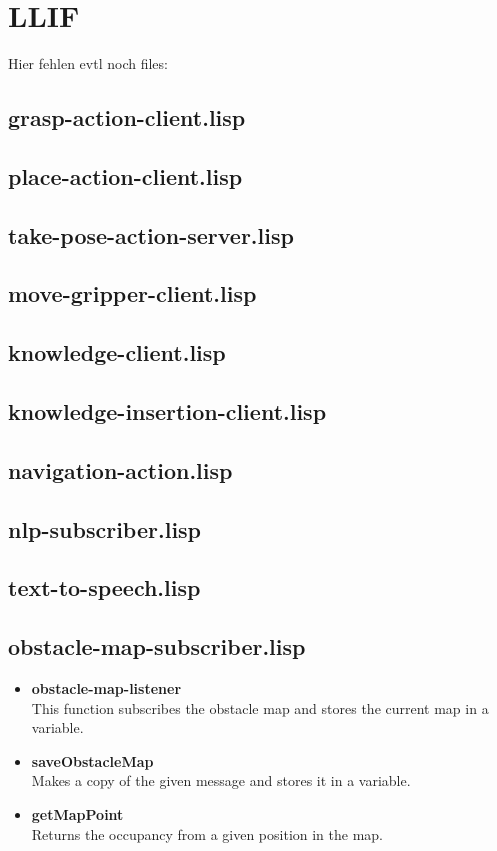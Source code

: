 \documentclass[main.tex]{subfiles}
\begin{document}
	  	\section{LLIF}
		Hier fehlen evtl noch files:
		\subsection{grasp-action-client.lisp}
		\subsection{place-action-client.lisp}
		\subsection{take-pose-action-server.lisp}
		\subsection{move-gripper-client.lisp}
		\subsection{knowledge-client.lisp}
		\subsection{knowledge-insertion-client.lisp}
		\subsection{navigation-action.lisp}
		\subsection{nlp-subscriber.lisp}
		\subsection{text-to-speech.lisp}
		\subsection{obstacle-map-subscriber.lisp}
	    \begin{itemize}
	    	\item \textbf{obstacle-map-listener} \\
	    	This function subscribes the obstacle map and stores the current map in a variable.
	    	\item \textbf{saveObstacleMap} \\
	    	Makes a copy of the given message and stores it in a variable.
	    	\item \textbf{getMapPoint} \\
	    	Returns the occupancy from a given position in the map.
	    \end{itemize}
\end{document}

